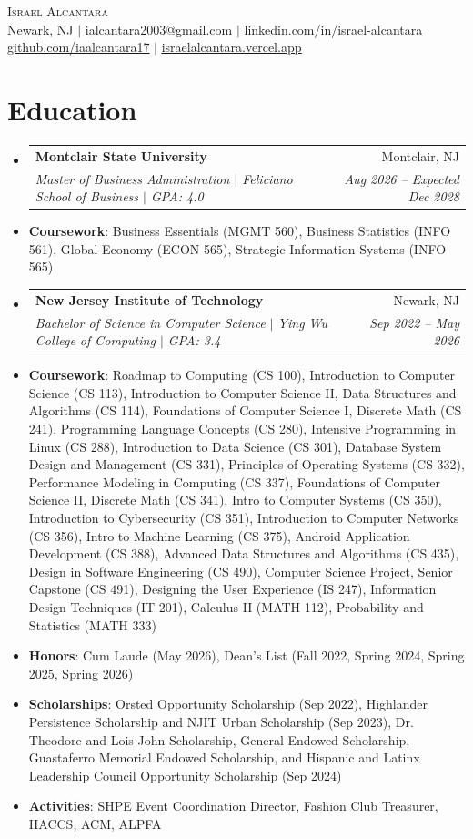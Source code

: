\documentclass[letterpaper,11pt]{article}
\makeatletter
\newcommand{\resumeFirstLine}[1]{\vspace{3pt}\item[]\small{#1}}
\newcommand{\resumeLine}[1]{\vspace{-1pt}\item[]\small{#1}}
\newcommand{\resumeSchoolGap}{\vspace{3pt}}
\newcommand{\resumeSubheading}[4]{
  \vspace{-2pt}\item
    \begin{tabular*}{0.97\textwidth}[t]{l@{\extracolsep{\fill}}r}
      \textbf{#1} & #2 \\
      \textit{\small#3} & \textit{\small #4} \\
    \end{tabular*}\vspace{-7pt}
}
\newcommand{\resumeSubHeadingListStart}{\begin{itemize}[leftmargin=0.15in, label={}, itemsep=1pt, parsep=0pt, topsep=2pt]}
\newcommand{\resumeSubHeadingListEnd}{\end{itemize}}
\makeatother
\begin{document}
\begin{center}
    {\Huge \scshape Israel Alcantara} \\ \vspace{1pt}
    \small Newark, NJ $|$ \href{mailto:ialcantara2003@gmail.com}{\underline{ialcantara2003@gmail.com}} $|$
    \href{https://www.linkedin.com/in/israel-alcantara}{\underline{linkedin.com/in/israel-alcantara}} \\
    \href{https://github.com/iaalcantara17}{\underline{github.com/iaalcantara17}} $|$
    \href{https://israelalcantara.vercel.app}{\underline{israelalcantara.vercel.app}}
\end{center}
\vspace{-8pt}
\section{Education}
  \resumeSubHeadingListStart
    \resumeSubheading
      {Montclair State University}{Montclair, NJ}
      {Master of Business Administration $|$ Feliciano School of Business $|$ GPA: 4.0}{Aug 2026 -- Expected Dec 2028}
      \resumeFirstLine{\textbf{Coursework}: Business Essentials (MGMT 560), Business Statistics (INFO 561), Global Economy (ECON 565), Strategic Information Systems (INFO 565)}
    \resumeSchoolGap
    \resumeSubheading
      {New Jersey Institute of Technology}{Newark, NJ}
      {Bachelor of Science in Computer Science $|$ Ying Wu College of Computing $|$ GPA: 3.4}{Sep 2022 -- May 2026}
      \resumeFirstLine{\textbf{Coursework}: Roadmap to Computing (CS 100), Introduction to Computer Science (CS 113), Introduction to Computer Science II, Data Structures and Algorithms (CS 114), Foundations of Computer Science I, Discrete Math (CS 241), Programming Language Concepts (CS 280), Intensive Programming in Linux (CS 288), Introduction to Data Science (CS 301), Database System Design and Management (CS 331), Principles of Operating Systems (CS 332), Performance Modeling in Computing (CS 337), Foundations of Computer Science II, Discrete Math (CS 341), Intro to Computer Systems (CS 350), Introduction to Cybersecurity (CS 351), Introduction to Computer Networks (CS 356), Intro to Machine Learning (CS 375), Android Application Development (CS 388), Advanced Data Structures and Algorithms (CS 435), Design in Software Engineering (CS 490), Computer Science Project, Senior Capstone (CS 491), Designing the User Experience (IS 247), Information Design Techniques (IT 201), Calculus II (MATH 112), Probability and Statistics (MATH 333)}
      \resumeLine{\textbf{Honors}: Cum Laude (May 2026), Dean's List (Fall 2022, Spring 2024, Spring 2025, Spring 2026)}
      \resumeLine{\textbf{Scholarships}: Orsted Opportunity Scholarship (Sep 2022), Highlander Persistence Scholarship and NJIT Urban Scholarship (Sep 2023), Dr. Theodore and Lois John Scholarship, General Endowed Scholarship, Guastaferro Memorial Endowed Scholarship, and Hispanic and Latinx Leadership Council Opportunity Scholarship (Sep 2024)}
      \resumeLine{\textbf{Activities}: SHPE Event Coordination Director, Fashion Club Treasurer, HACCS, ACM, ALPFA}
  \resumeSubHeadingListEnd
\end{document}
